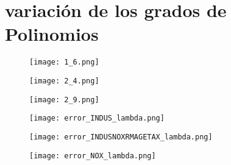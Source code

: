 \section{variación de los grados de Polinomios}


\begin{figure}[h]
    \centering
    \texttt{[image: 1\_6.png]}
    \caption{}
    \label{}
\end{figure}
\begin{figure}[h]
    \centering
    \texttt{[image: 2\_4.png]}
    \caption{}
    \label{}
\end{figure}
\begin{figure}[h]
    \centering
    \texttt{[image: 2\_9.png]}
    \caption{}
    \label{}
\end{figure}

\begin{figure}[h]
    \centering
    \texttt{[image: error\_INDUS\_lambda.png]}
    \caption{}
    \label{error_INDUS_lambda}
\end{figure}
\begin{figure}[h]
    \centering
    \texttt{[image: error\_INDUSNOXRMAGETAX\_lambda.png]}
    \caption{}
    \label{error_INDUSNOXRMAGETAX_lambda}
\end{figure}
\begin{figure}[h]
    \centering
    \texttt{[image: error\_NOX\_lambda.png]}
    \caption{}
    \label{error_NOX_lambda}
\end{figure}




